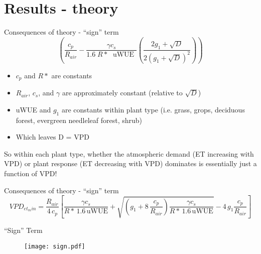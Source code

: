 \documentclass{beamer}
\begin{document}
\section{Results - theory}
\begin{frame}{Consequences of theory - ``sign'' term}
  \[ \left(\frac{ c_p}{R_{air}} - \frac{\gamma c_s }{1.6 \; R*\; \text{ uWUE }} \left( \frac{2 g_1 + \sqrt{D}}{2 (g_1 + \sqrt{D})^2}\right) \right)\]
  \begin{itemize}
  \item $c_p$ and $R*$ are constants
  \item $R_{air}$, $c_s$, and $\gamma$ are approximately constant (relative to $\sqrt{D}$)
  \item uWUE and $g_1$ are constants within plant type (i.e. grass, grops, deciduous forest, evergreen needleleaf forest, shrub)
  \item Which leaves D = VPD
  \end{itemize}
  So within each plant type, whether the atmospheric demand (ET increasing with VPD) or plant response (ET decreasing with VPD) dominates is essentially just a function of VPD!
\end{frame}

\begin{frame}{Consequences of theory - ``sign'' term}
  \scriptsize
  \[ VPD_{et_min} = \frac{R_{air}}{4 \, c_p} \left[ \frac{\gamma  c_s}{R* \, 1.6\, \text{uWUE}} + \sqrt{\left(g_1 + 8\, \frac{c_p}{R_{air}}\right) \frac{\gamma c_s}{R* \, 1.6\, \text{uWUE}}} - 4 \, g_1 \frac{ c_p}{R_{air}}\right] \]
\scriptsize
\end{frame}

  

\begin{frame}{``Sign'' Term}
  \begin{figure}
    \texttt{[image: sign.pdf]}
  \end{figure}
\end{frame}
\end{document}
